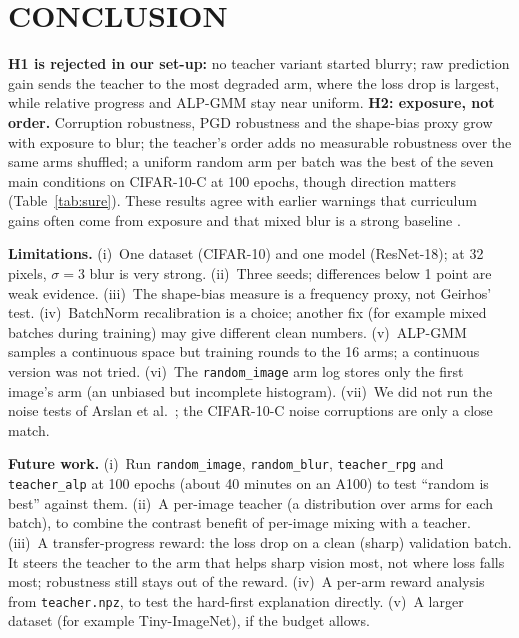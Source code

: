 \documentclass[a4paper,12pt]{report}
\newcommand{\cond}[1]{\texttt{#1}}
\begin{document}
\chapter{CONCLUSION}

\textbf{H1 is rejected in our set-up:} no teacher variant started blurry; raw prediction gain sends the teacher to the most degraded arm, where the loss drop is largest, while relative progress and ALP-GMM stay near uniform. \textbf{H2: exposure, not order.} Corruption robustness, PGD robustness and the shape-bias proxy grow with exposure to blur; the teacher's order adds no measurable robustness over the same arms shuffled; a uniform random arm per batch was the best of the seven main conditions on CIFAR-10-C at 100 epochs, though direction matters (Table~\ref{tab:sure}). These results agree with earlier warnings that curriculum gains often come from exposure \cite{wu2021curricula,katzhendler2019} and that mixed blur is a strong baseline \cite{jang2024blur}.

\textbf{Limitations.} (i)~One dataset (CIFAR-10) and one model (ResNet-18); at 32 pixels, $\sigma=3$ blur is very strong. (ii)~Three seeds; differences below 1 point are weak evidence. (iii)~The shape-bias measure is a frequency proxy, not Geirhos' test. (iv)~BatchNorm recalibration is a choice; another fix (for example mixed batches during training) may give different clean numbers. (v)~ALP-GMM samples a continuous space but training rounds to the 16 arms; a continuous version was not tried. (vi)~The \cond{random\_image} arm log stores only the first image's arm (an unbiased but incomplete histogram). (vii)~We did not run the noise tests of Arslan et al.\ \cite{arslan2024noise}; the CIFAR-10-C noise corruptions are only a close match.

\textbf{Future work.} (i)~Run \cond{random\_image}, \cond{random\_blur}, \cond{teacher\_rpg} and \cond{teacher\_alp} at 100 epochs (about 40 minutes on an A100) to test ``random is best'' against them. (ii)~A per-image teacher (a distribution over arms for each batch), to combine the contrast benefit of per-image mixing with a teacher. (iii)~A transfer-progress reward: the loss drop on a clean (sharp) validation batch. It steers the teacher to the arm that helps sharp vision most, not where loss falls most; robustness still stays out of the reward. (iv)~A per-arm reward analysis from \texttt{teacher.npz}, to test the hard-first explanation directly. (v)~A larger dataset (for example Tiny-ImageNet), if the budget allows.
\end{document}
